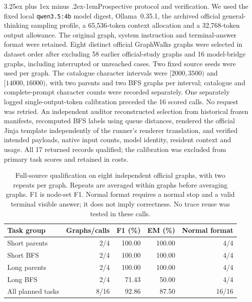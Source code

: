 \documentclass[10pt]{article}
\makeatletter
\renewcommand\paragraph{\@startsection{paragraph}{4}{\parindent}%
  {3.25ex plus 1ex minus .2ex}{-1em}{\normalfont\normalsize\bfseries}}
\makeatother
\begin{document}
\paragraph{Prospective protocol and verification.} We used the fixed local \texttt{qwen3.5:4b} model digest, Ollama~0.35.1, the archived official general-thinking sampling profile, a 65,536-token context allocation and a 32,768-token output allowance. The original graph, system instruction and terminal-answer format were retained. Eight distinct official GraphWalks graphs were selected in dataset order after excluding 58 earlier official-study graphs and 16 model-bridge graphs, including interrupted or unreached cases. Two fixed source seeds were used per graph. The catalogue character intervals were $[2000,3500)$ and $[14000,16000)$, with two parents and two BFS graphs per interval; catalogue and complete-prompt character counts were recorded separately. One separately logged single-output-token calibration preceded the 16 scored calls. No request was retried. An independent auditor reconstructed selection from historical frozen manifests, recomputed BFS labels using queue distances, rendered the official Jinja template independently of the runner's renderer translation, and verified intended payloads, native input counts, model identity, resident context and usage. All 17 returned records qualified; the calibration was excluded from primary task scores and retained in costs.

\begin{table}[htbp]
\centering
\caption{Full-source qualification on eight independent official graphs, with two repeats per graph. Repeats are averaged within graphs before averaging graphs. F1 is node-set F1. Normal format requires a normal stop and a valid terminal visible answer; it does not imply correctness. No trace reuse was tested in these calls.}
\label{tab:hybrid-source}
\begin{tabular}{lrrrr}
\toprule
Task group & Graphs/calls & F1 (\%) & EM (\%) & Normal format \\
\midrule
Short parents & 2/4 & 100.00 & 100.00 & 4/4 \\
Short BFS & 2/4 & 100.00 & 100.00 & 4/4 \\
Long parents & 2/4 & 100.00 & 100.00 & 4/4 \\
Long BFS & 2/4 & 71.43 & 50.00 & 4/4 \\
All planned tasks & 8/16 & 92.86 & 87.50 & 16/16 \\
\bottomrule
\end{tabular}
\end{table}
\end{document}
